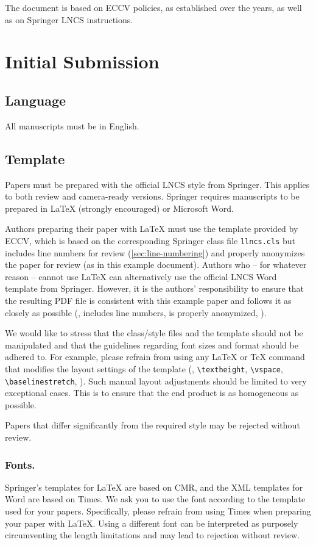\documentclass[runningheads]{llncs}
\begin{document}
The document is based on ECCV policies, as established over the years, as well as on Springer LNCS instructions.

\section{Initial Submission}

\subsection{Language}
All manuscripts must be in English.


\subsection{Template}
Papers must be prepared with the official LNCS style from Springer.
This applies to both review and camera-ready versions.
Springer requires manuscripts to be prepared in \LaTeX{} (strongly encouraged) or Microsoft Word. 

Authors preparing their paper with \LaTeX{} must use the template provided by ECCV, which is based on the corresponding Springer class file \texttt{llncs.cls} but includes line numbers for review (\cref{sec:line-numbering}) and properly anonymizes the paper for review (as in this example document).
Authors who -- for whatever reason -- cannot use \LaTeX{} can alternatively use the official LNCS Word template from Springer.
However, it is the authors' responsibility to ensure that the resulting PDF file is consistent with this example paper and follows it as closely as possible (\ie, includes line numbers, is properly anonymized, \etc).

We would like to stress that the class/style files and the template should not be manipulated and that the guidelines regarding font sizes and format should be adhered to. 
For example, please refrain from using any \LaTeX{} or \TeX{} command that modifies the layout settings of the template (\eg, \verb+\textheight+, \verb+\vspace+, \verb+\baselinestretch+, \etc).
Such manual layout adjustments should be limited to very exceptional cases.
This is to ensure that the end product is as homogeneous as possible.

Papers that differ significantly from the required style may be rejected without review.


\subsubsection{Fonts.}
Springer's templates for \LaTeX{} are based on CMR, and the XML templates for Word are based on Times. 
We ask you to use the font according to the template used for your papers. 
Specifically, please refrain from using Times when preparing your paper with \LaTeX{}.
Using a different font can be interpreted as purposely circumventing the length limitations and may lead to rejection without review.
\end{document}
